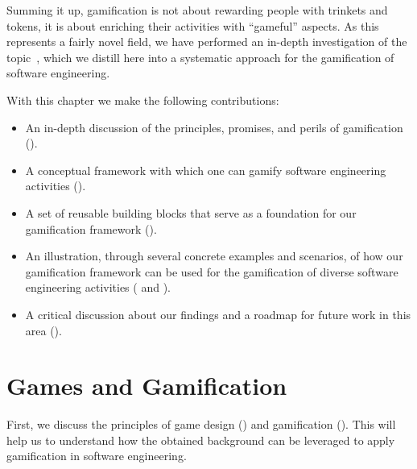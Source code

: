 Summing it up, gamification is not about rewarding people with trinkets and tokens, it is about enriching their activities with ``gameful'' aspects.
As this represents a fairly novel field, we have performed an in-depth investigation of the topic~\cite{Mast2014a}, which we distill here into a systematic approach for the gamification of software engineering.

With this chapter we make the following contributions:

\begin{itemize}

\item An in-depth discussion of the principles, promises, and perils of gamification ().

\item A conceptual framework with which one can gamify software engineering activities ().

\item A set of reusable building blocks that serve as a foundation for our gamification framework ().

\item An illustration, through several concrete examples and scenarios, of how our gamification framework can be used for the gamification of diverse software engineering activities ( and ).

\item A critical discussion about our findings and a roadmap for future work in this area ().

\end{itemize}


\section{Games and Gamification} \label{sec:gamification-principles}

First, we discuss the principles of game design () and gamification ().
This will help us to understand how the obtained background can be leveraged to apply gamification in software engineering.

